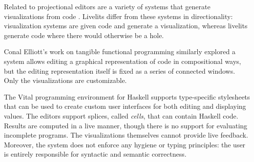 Related to projectional editors are 
a variety of systems that generate visualizations from code \cite{DBLP:conf/chi/Lerner20,koschke2003software,urquiza2004survey,Goldberg84smalltalk-80-}. Livelits differ 
from these systems in directionality: visualization systems are given code and generate
a visualization, whereas livelits generate code where there would otherwise
be a hole.

Conal Elliott's work on tangible functional programming \cite{DBLP:conf/icfp/Elliott07} similarly explored a
system allows editing a graphical representation of code in compositional ways, 
but the editing representation itself is fixed as a series of connected windows.
Only the visualizations are customizable.

The Vital programming environment for Haskell \cite{hanna2002interactive} 
supports type-specific stylesheets
that can be used to create custom user interfaces for both editing and displaying
values. The editors support splices, called \emph{cells}, that can contain 
Haskell code. Results are computed in a live manner, though there is no support
for evaluating incomplete programs. The visualizations themselves cannot provide
live feedback. Moreover, the system does not enforce any hygiene or typing principles:
the user is entirely responsible for syntactic and semantic correctness.



